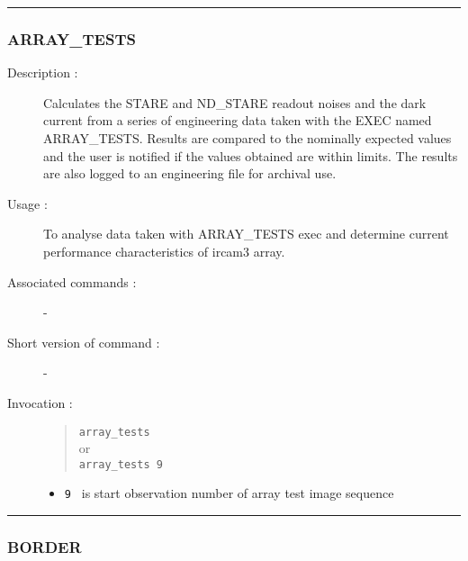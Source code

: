 \hrule
\subsubsection*{\label{ARRAY_TESTS}ARRAY\_TESTS}

\begin{description}

\item[Description :] Calculates the STARE and ND\_STARE readout noises and
the dark current from a series of engineering data taken with the EXEC
named ARRAY\_TESTS\@.  Results are compared to the nominally expected
values and the user is notified if the values obtained are within limits.
The results are also logged to an engineering file for archival use.

\item[Usage :] To analyse data taken with ARRAY\_TESTS exec and
determine current performance characteristics of {\sc ircam3} array.

\item[Associated commands :] -
\item[Short version of command :] -
\item[Invocation :]

\begin{quote}{\tt  array\_tests }\\
or \\
{\tt array\_tests 9 }
\end{quote}

\begin{itemize}

\item {\tt 9 } is start observation number of array test image sequence

\end{itemize}

\end{description}

\hrule
\subsubsection*{\label{BORDER}BORDER}

